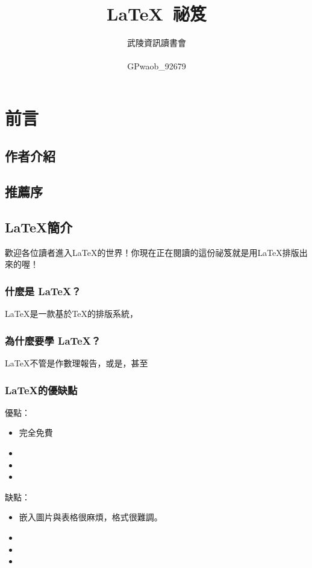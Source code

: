 \documentclass[14pt, oneside]{extbook}
\title{
	\sffamily\Huge \textrm{\LaTeX}\ 祕笈
}
\author{
	\sffamily\LARGE 武陵資訊讀書會 \\\\
	\fontspec{Torus}{}\LARGE GPwaob\_92679
}
\date{}
\begin{document}
	\maketitle
	\tableofcontents

	\part{前言}
	\chapter*{作者介紹}
		
	\chapter*{推薦序}
			
			
			
		
		
		
		
		
	\chapter{\LaTeX 簡介}
		歡迎各位讀者進入\LaTeX 的世界！你現在正在閱讀的這份祕笈就是用\LaTeX 排版出來的喔！
	\section{什麼是 \LaTeX ？}
		\LaTeX 是一款基於\TeX 的排版系統，
	\section{為什麼要學 \LaTeX ？}
		\LaTeX 不管是作數理報告，或是，甚至
	\section{\LaTeX 的優缺點}
		優點：
		\begin{itemize}
			\item 完全免費
			\item 
			\item 
			\item 
		\end{itemize}
			
		缺點：
		\begin{itemize}
			\item 嵌入圖片與表格很麻煩，格式很難調。
			\item 
			\item 
			\item 		
		\end{itemize}
\end{document}
